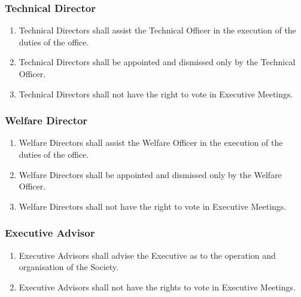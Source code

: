 \documentclass{scrartcl}
\begin{document}
            \subsubsection{Technical Director}
                \label{executive--positions--technical-director}
                \begin{enumerate}
                    \item Technical Directors shall assist the Technical Officer in the execution of the duties of the office.
                    \item Technical Directors shall be appointed and dismissed only by the Technical Officer.
                    \item Technical Directors shall not have the right to vote in Executive Meetings.
                \end{enumerate}

            \subsubsection{Welfare Director}
                \label{executive--positions--welfare-director}
                \begin{enumerate}
                    \item Welfare Directors shall assist the Welfare Officer in the execution of the duties of the office.
                    \item Welfare Directors shall be appointed and dismissed only by the Welfare Officer.
                    \item Welfare Directors shall not have the right to vote in Executive Meetings.
                \end{enumerate}

            \subsubsection{Executive Advisor}
                \label{executive--positions--advisor}
                \begin{enumerate}
                    \item Executive Advisors shall advise the Executive as to the operation and organisation of the Society.
                    \item Executive Advisors shall not have the rights to vote in Executive Meetings.
                \end{enumerate}
\end{document}

